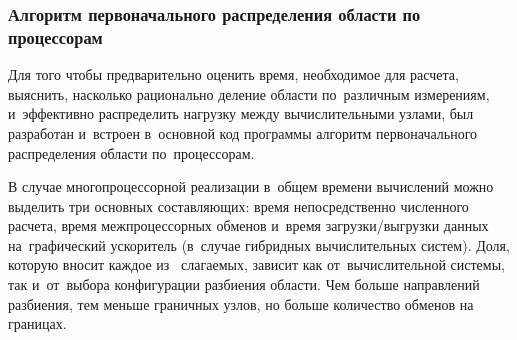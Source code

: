 \subsubsection{Алгоритм первоначального распределения области по процессорам}

Для того чтобы предварительно оценить время, необходимое для расчета, выяснить, насколько 
рационально деление области по~различным измерениям, и~эффективно распределить нагрузку
между вычислительными узлами, был разработан и~встроен в~основной код программы
алгоритм первоначального распределения области по~процессорам.

В случае многопроцессорной реализации в~общем времени вычислений можно выделить
три основных составляющих: время непосредственно численного расчета, время
межпроцессорных обменов и~время загрузки/выгрузки данных на~графический ускоритель 
(в~случае гибридных вычислительных систем). Доля, которую вносит каждое из~
слагаемых, зависит как от~вычислительной системы, так и~от~выбора конфигурации разбиения
области. Чем больше направлений разбиения, тем меньше граничных узлов, но
больше количество обменов на границах.

